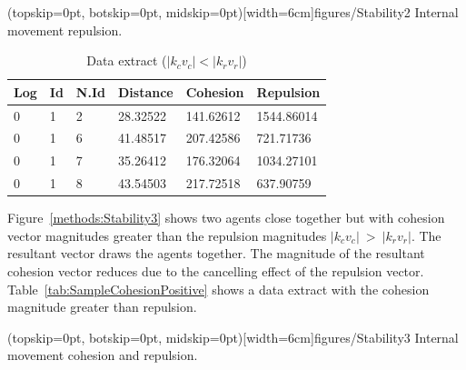 \documentclass{ieeeaccess}
\begin{document}
\Figure[t!](topskip=0pt, botskip=0pt,
midskip=0pt)[width=6cm]{figures/Stability2} {Internal movement
repulsion.\label{methods:Stability2}}


\begin{table}[H]
\begin{center}
\begin{tabular}{| l | l | l | l | l | l |}
\hline
Log &	Id &	N.Id &	Distance &	{\color{green}Cohesion} &	{\color{red}Repulsion} 	\\ \hline
0 & 1 & 2 & 28.32522 & {\color{green}141.62612} & {\color{red}1544.86014} \\ \hline
0 & 1 & 6 & 41.48517 & {\color{green}207.42586} & {\color{red}721.71736} \\ \hline
0 & 1 & 7 & 35.26412 & {\color{green}176.32064} & {\color{red}1034.27101} \\ \hline
0 & 1 & 8 & 43.54503 & {\color{green}217.72518} & {\color{red}637.90759} \\
\hline
\end{tabular}\caption{Data extract ($|k_cv_c| < |k_rv_r|$)} \label{tab:SampleReplusionPositive}
\end{center}
\end{table}

Figure~\ref{methods:Stability3} shows two agents close together but with
cohesion vector magnitudes greater than the repulsion magnitudes
$|k_cv_c|~>~|k_rv_r|$. The resultant vector draws the agents together. The
magnitude of the resultant cohesion vector reduces due to the cancelling effect
of the repulsion vector. Table~\ref{tab:SampleCohesionPositive} shows a data
extract with the cohesion magnitude greater than repulsion.

\Figure[t!](topskip=0pt, botskip=0pt,
midskip=0pt)[width=6cm]{figures/Stability3} {Internal movement cohesion and
repulsion.\label{methods:Stability3}}

\end{document}

